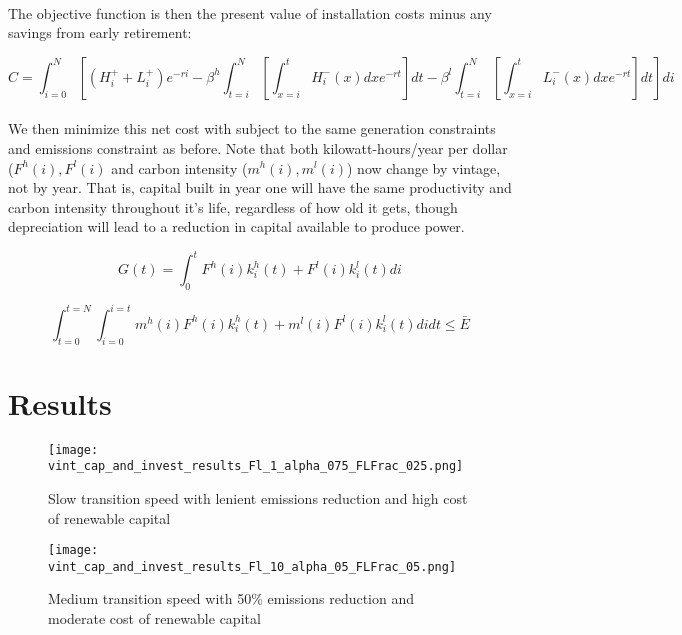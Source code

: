 \documentclass{article}
\begin{document}
\paragraph{} The objective function is then the present value of installation costs minus any savings from early retirement:

\begin{equation}\label{eq:VintObj}
C = \int_{i=0}^N  \left[ (H^+_i + L^+_i)e^{-ri}  - \beta^h  \int_{t=i}^N \left[\int_{x=i}^t H^-_i(x) dx e^{-rt}\right] dt - \beta^l  \int_{t=i}^N \left[\int_{x=i}^t L^-_i(x) dx e^{-rt}\right] dt\right] di
\end{equation}

\paragraph{} We then minimize this net cost with subject to the same generation constraints and emissions constraint as before. Note that both kilowatt-hours/year per dollar ($F^h(i), F^l(i)$ and carbon intensity ($m^h(i), m^l(i)$) now change by vintage, not by year. That is, capital built in year one will have the same productivity and carbon intensity throughout it's life, regardless of how old it gets, though depreciation will lead to a reduction in capital available to produce power. 

\begin{equation}
G(t) = \int_0^t F^h(i)k_i^h(t) + F^l(i)k_i^l(t) di
\end{equation}

\begin{equation}
\int_{t=0}^{t=N}\int_{i=0}^{i=t} m^h(i)F^h(i)k_i^h(t) + m^l(i)F^l(i)k_i^l(t) di dt \leq \bar{E}
\end{equation}

\section{Results}



\begin{figure}[h]
\texttt{[image: vint\_cap\_and\_invest\_results\_Fl\_1\_alpha\_075\_FLFrac\_025.png]}
\caption{Slow transition speed with lenient emissions reduction and high cost of renewable capital\label{fig:VintResultsFl=1_Alpha75_Frac25}}
\end{figure}

\begin{figure}[h]
\texttt{[image: vint\_cap\_and\_invest\_results\_Fl\_10\_alpha\_05\_FLFrac\_05.png]}
\caption{Medium transition speed with 50\% emissions reduction and moderate cost of renewable capital\label{fig:VintResultsFl=10_Alpha50_Frac50}}
\end{figure}
\end{document}
